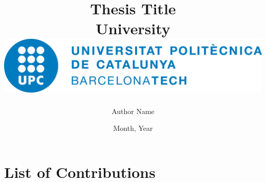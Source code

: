 \documentclass[12pt,singleside]{report}
\title{{Thesis Title}\\
	{\large University}\\
	{\label{img:logo_UPC}
	\includegraphics[scale=0.5]{logo_UPC.jpg}}
}
\author{Author Name}
\date{Month, Year}
\begin{document}

\clearpage

\clearpage
\chapter*{List of Contributions}

\clearpage
\printbibliography 
\end{document}
